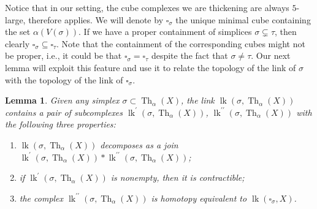 \documentclass[12pt, letterpaper]{article}
\newcommand{\Th}{\operatorname{Th}}
\newcommand{\lk}{\operatorname{lk}}
\theoremstyle{plain}
\newtheorem{lem}[thm]{Lemma}
\theoremstyle{definition}
\begin{document}
Notice that in our setting, the cube complexes we are thickening are always $5$-large, therefore  applies. We will denote by $\square_\sigma$ the unique minimal cube containing the set $\alpha(V(\sigma))$. If we have a proper containment of simplices $\sigma \subsetneq \tau$, then clearly $\square _\sigma \subseteq \square_\tau$. Note that the containment of the corresponding cubes might not be proper, i.e., it could be that $\square _\sigma =\square_\tau$ despite the fact that $\sigma \neq \tau$. Our next lemma will exploit this feature and use it to relate the topology of the link of $\sigma$ with the topology of the link of $\square_\sigma$.

\begin{lem}\label{lem:three-props}
Given any simplex $\sigma \subset \Th_\alpha(X)$, the link $\lk(\sigma, \Th_\alpha(X))$ contains a pair of subcomplexes $\lk^\prime(\sigma, \Th_\alpha(X))$, $\lk^{\prime \prime}(\sigma, \Th_\alpha(X))$ with the following three properties:
\begin{enumerate}
\item $\lk(\sigma, \Th_\alpha(X))$ decomposes as a join $\lk^\prime(\sigma, \Th_\alpha(X))*\lk^{\prime \prime}(\sigma, \Th_\alpha(X))$;
\item if $\lk^\prime(\sigma, \Th_\alpha(X))$ is nonempty, then it is contractible;
\item the complex $\lk^{\prime \prime}(\sigma, \Th_\alpha(X))$ is homotopy equivalent to $\lk(\square_\sigma , X)$.
\end{enumerate}
\end{lem}
\end{document}
